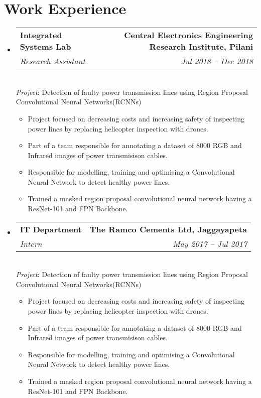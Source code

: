 \documentclass[a4paper]{article}
\makeatletter
\newcommand{\resumeSubheading}[4]{
	\vspace{-1pt}\item
	\begin{tabular*}{0.97\textwidth}[t]{l@{\extracolsep{\fill}}r}
		\textbf{\normalsize #1} & {\normalsize #2} \\
		\textit{\small#3} & \textit{\small #4} \\
	\end{tabular*}
	\smallskip \\
}
\newcommand{\resumeSubItemOneArg}[1]{\item \small #1\vspace{-1pt}}
\newcommand{\resumeSubHeadingListStart}{\begin{itemize}[leftmargin=*]}
\newcommand{\resumeSubHeadingListEnd}{\end{itemize}}
\newcommand{\resumeItemListStart}{\begin{itemize} \vspace*{-5pt}}
\newcommand{\resumeItemListEnd}{\end{itemize}}
\makeatother
\begin{document}

\section{Work Experience}
\justifying
\resumeSubHeadingListStart
\resumeSubheading
{Integrated Systems Lab}{\textbf{Central Electronics Engineering Research Institute, Pilani}}
{Research Assistant}{Jul 2018 -- Dec 2018}
\emph{Project}: Detection of faulty power transmission lines using Region Proposal Convolutional Neural Networks(RCNNs)
\resumeItemListStart
\resumeSubItemOneArg{Project focused on decreasing costs and increasing safety of inspecting power lines by replacing helicopter inspection with drones.}
\resumeSubItemOneArg{Part of a team responsible for annotating a dataset of 8000 RGB and Infrared images of power transmisison cables.}
\resumeSubItemOneArg{Responsible for modelling, training and optimising a Convolutional Neural Network to detect healthy power lines.}
\resumeSubItemOneArg{Trained a masked region proposal convolutional neural network having a ResNet-101 and FPN Backbone.}
\resumeItemListEnd

\resumeSubheading
{IT Department}{\textbf{The Ramco Cements Ltd, Jaggayapeta}}
{Intern}{May 2017 -- Jul 2017}
\emph{Project}: Detection of faulty power transmission lines using Region Proposal Convolutional Neural Networks(RCNNs)
\resumeItemListStart
\resumeSubItemOneArg{Project focused on decreasing costs and increasing safety of inspecting power lines by replacing helicopter inspection with drones.}
\resumeSubItemOneArg{Part of a team responsible for annotating a dataset of 8000 RGB and Infrared images of power transmisison cables.}
\resumeSubItemOneArg{Responsible for modelling, training and optimising a Convolutional Neural Network to detect healthy power lines.}
\resumeSubItemOneArg{Trained a masked region proposal convolutional neural network having a ResNet-101 and FPN Backbone.}
\resumeItemListEnd
\resumeSubHeadingListEnd

\end{document}

